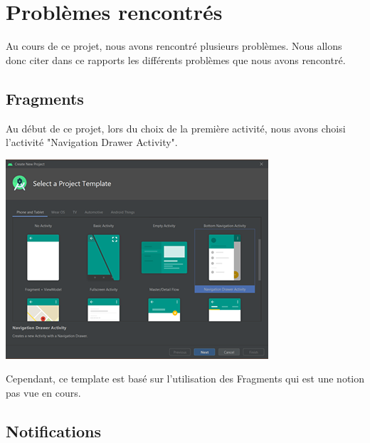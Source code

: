\documentclass[12pt,a4paper]{report}
\begin{document}
\section{Problèmes rencontrés}
\begin{flushleft}
\justify
Au cours de ce projet, nous avons rencontré plusieurs problèmes. Nous allons donc citer dans ce rapports les différents problèmes que nous avons rencontré.
\end{flushleft}
\subsection{Fragments}
\begin{flushleft}
\justify
Au début de ce projet, lors du choix de la première activité, nous avons choisi l'activité "Navigation Drawer Activity".\\
\center
\begin{minipage}{0.48\linewidth}
\includegraphics[width=\linewidth]{Template}
\end{minipage}
\justify
Cependant, ce template est basé sur l'utilisation des 
Fragments qui est une notion pas vue en cours.
\end{flushleft}
\subsection{Notifications}
\end{document}
